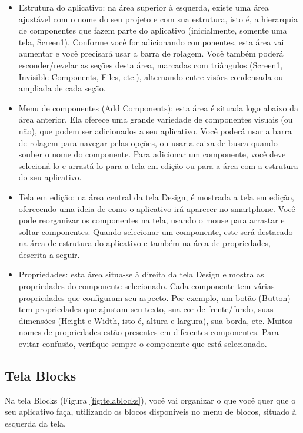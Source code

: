 \documentclass[11pt,fleqn]{book} %
\begin{document}
\begin{itemize}
\item Estrutura do aplicativo: na área superior à esquerda, existe uma área ajustável com o nome do seu projeto e com sua estrutura, isto é, a hierarquia de componentes que fazem parte do aplicativo (inicialmente, somente uma tela, Screen1). Conforme você for adicionando componentes, esta área vai aumentar e você precisará usar a barra de rolagem. Você também poderá esconder/revelar as seções desta área, marcadas com triângulos (Screen1, Invisible Components, Files, etc.), alternando entre visões condensada ou ampliada de cada seção.


\item Menu de componentes (Add Components): esta área é situada logo abaixo da área anterior. Ela oferece uma grande variedade de componentes visuais (ou não), que podem ser adicionados a seu aplicativo. Você poderá usar a barra de rolagem para navegar pelas opções, ou usar a caixa de busca quando souber o nome do componente. Para adicionar um componente, você deve selecioná-lo e arrastá-lo para a tela em edição ou para a área com a estrutura do seu aplicativo.

\item Tela em edição: na área central da tela Design, é mostrada a tela em edição, oferecendo uma ideia de como o aplicativo irá aparecer no smartphone. Você pode reorganizar os componentes na tela, usando o mouse para arrastar e soltar componentes. Quando selecionar um componente, este será destacado na área de estrutura do aplicativo e também na área de propriedades, descrita a seguir.


\item Propriedades: esta área situa-se à direita da tela Design e mostra as propriedades do componente selecionado. Cada componente tem várias propriedades que configuram seu aspecto. Por exemplo, um botão (Button) tem propriedades que ajustam seu texto, sua cor de frente/fundo, suas dimensões (Height e Width, isto é, altura e largura), sua borda, etc. Muitos nomes de propriedades estão presentes em diferentes componentes. Para evitar confusão, verifique sempre o componente que está selecionado.



\end{itemize}

\subsection{Tela Blocks}
Na tela Blocks (Figura \ref{fig:telablocks}), você vai organizar o que você quer que o seu aplicativo faça, utilizando os blocos disponíveis no menu de blocos, situado à esquerda da tela. 
\end{document}
